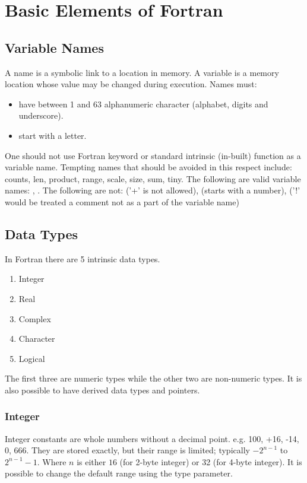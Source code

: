 \documentclass[class=book,crop=false]{standalone}
\begin{document}
\chapter{Basic Elements of Fortran}
    \section{Variable Names}
    A name is a symbolic link to a location in memory. A variable is a memory location whose value may be changed during execution.
    Names must:
    \begin{itemize}
        \item have between 1 and 63 alphanumeric character (alphabet, digits and underscore).
        \item start with a letter.
    \end{itemize}
    One should not use Fortran keyword or standard intrinsic (in-built) function as a variable name.
    Tempting names that should be avoided in this respect include: counts, len, product, range, scale, size, sum, tiny.
    The following are valid variable names: , .
    The following are not:  ('+' is not allowed),  (starts with a number),  ('!' would be treated a comment not as a part of the variable name)
    \section{Data Types}
    In Fortran there are 5 intrinsic data types.
    \begin{enumerate}
        \item Integer
        \item Real 
        \item Complex
        \item Character
        \item Logical
    \end{enumerate}
    The first three are numeric types while the other two are non-numeric types. 
    It is also possible to have derived data types and pointers.
    \subsection{Integer}
    Integer constants are whole numbers without a decimal point. e.g. 100, +16, -14, 0, 666. They are stored exactly, but their range is limited; typically $ -2^{n-1} $ to $ 2^{n-1}-1 $. Where $ n $ is either $ 16 $ (for 2-byte integer) or 32 (for 4-byte integer). 
    It is possible to change the default range using the  type parameter.
\end{document}
